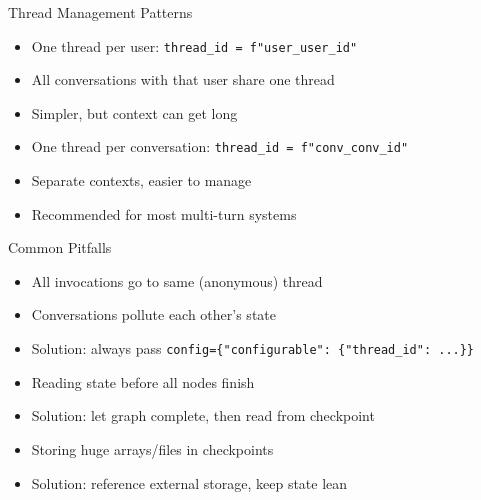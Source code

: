 \documentclass[aspectratio=169,11pt]{beamer}
\begin{document}
\begin{frame}{Thread Management Patterns}
  \begin{conceptbox}
    \setlength{\itemsep}{1pt}
    \begin{itemize}
      \item One thread per user: \texttt{thread\_id = f"user\_{user\_id}"}
      \item All conversations with that user share one thread
      \item Simpler, but context can get long
    \end{itemize}
  \end{conceptbox}
  \vspace{0.1cm}
  \begin{conceptbox}
    \setlength{\itemsep}{1pt}
    \begin{itemize}
      \item One thread per conversation: \texttt{thread\_id = f"conv\_{conv\_id}"}
      \item Separate contexts, easier to manage
      \item Recommended for most multi-turn systems
    \end{itemize}
  \end{conceptbox}
\end{frame}

\begin{frame}{Common Pitfalls}
  \begin{warningbox}
    \setlength{\itemsep}{1pt}
    \begin{itemize}
      \item All invocations go to same (anonymous) thread
      \item Conversations pollute each other's state
      \item Solution: always pass \texttt{config=\{"configurable": \{"thread\_id": ...\}\}}
    \end{itemize}
  \end{warningbox}
  \vspace{0.1cm}
  \begin{warningbox}
    \setlength{\itemsep}{1pt}
    \begin{itemize}
      \item Reading state before all nodes finish
      \item Solution: let graph complete, then read from checkpoint
    \end{itemize}
  \end{warningbox}
  \vspace{0.1cm}
  \begin{warningbox}
    \setlength{\itemsep}{1pt}
    \begin{itemize}
      \item Storing huge arrays/files in checkpoints
      \item Solution: reference external storage, keep state lean
    \end{itemize}
  \end{warningbox}
\end{frame}
\end{document}
